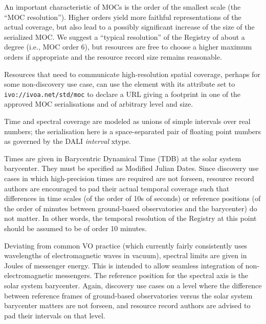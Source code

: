 \documentclass[11pt,a4paper]{ivoa}
\begin{document}
An important characteristic of MOCs is the order of the smallest scale
(the ``MOC resolution'').  Higher orders yield more faithful
representations of the actual coverage, but also lead to a possibly
significant increase of the size of the serialized MOC.  We suggest a
``typical resolution'' of the Registry of about a degree (i.e., MOC
order 6), but resources are free to choose a higher maximum orders if
appropriate and the resource record size remains reasonable.

Resources that need to communicate high-resolution spatial coverage,
perhaps for some non-discovery use case, can use the 
element with its  attribute set to
\nolinkurl{ivo://ivoa.net/std/moc} to declare a URL giving a
footprint in one of the approved MOC serialisations and of arbitrary
level and size.

Time and spectral coverage are modeled as unions of simple
intervals over real numbers; the serialisation here is a space-separated
pair of floating point numbers as governed by the DALI \emph{interval}
xtype.

Times are given in Barycentric Dynamical Time (TDB) at the solar system
barycenter.  They must be specified as Modified Julian Dates.  Since
discovery use cases in which high-precision times are required are not
forseen, resource record authors are encouraged to pad their actual
temporal coverage such that differences in time scales (of the order of
10s of seconds) or reference positions (of the order of minutes between
ground-based observatories and the barycenter) do not matter.  In other
words, the temporal resolution of the Registry at this point should be
assumed to be of order 10 minutes.

Deviating from common VO practice (which currently fairly consistently
uses wavelengths of electromagnetic waves in vacuum), spectral limits are
given in Joules of messenger energy.  This is intended to allow seamless
integration of non-elec\-tromagnetic messengers.  The reference position
for the spectral axis is the solar system barycenter.  Again, discovery
use cases on a level where the difference between reference frames of
ground-based observatories versus the solar system barycenter matters
are not forseen, and resource record authors are advised to pad their
intervals on that level.
\end{document}
